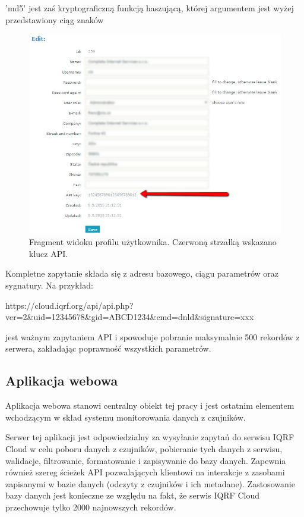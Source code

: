 'md5' jest zaś kryptograficzną funkcją haszującą, której argumentem jest wyżej przedstawiony ciąg znaków 


\begin{figure}[H]
    \includegraphics[width=\textwidth]{zdj/api-key.png}
    \caption{Fragment widoku profilu użytkownika. Czerwoną strzałką wskazano klucz API.}
\end{figure}

Kompletne zapytanie składa się z adresu bazowego, ciągu parametrów oraz sygnatury. Na przykład:
\begin{center}
    \begin{small}
        https://cloud.iqrf.org/api/api.php?ver=2\&uid=12345678\&gid=ABCD1234\&cmd=dnld\&signature=xxx
    \end{small}
\end{center}

jest ważnym zapytaniem API i spowoduje pobranie maksymalnie 500 rekordów z serwera, zakładając poprawność wszystkich parametrów.

\subsection{Aplikacja webowa}

Aplikacja webowa stanowi centralny obiekt tej pracy i jest ostatnim elementem wchodzącym w skład systemu monitorowania danych
z czujników. 

Serwer tej aplikacji jest odpowiedzialny za wysyłanie zapytań do serwisu IQRF Cloud w celu poboru danych z czujników, pobieranie
tych danych z serwisu, walidacje, filtrowanie, formatowanie i zapisywanie do bazy danych. Zapewnia również szereg ścieżek API pozwalających
klientowi na interakcje z zasobami zapisanymi w bazie danych (odczyty z czujników i ich metadane). Zastosowanie bazy danych 
jest konieczne ze względu na fakt, że serwis IQRF Cloud przechowuje tylko 2000 najnowszych rekordów.

